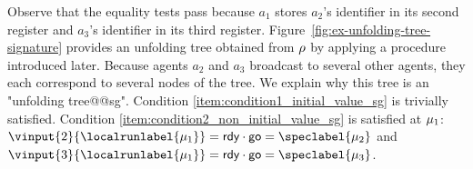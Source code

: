\begin{example}
Observe that the equality tests pass because $a_1$ stores $a_2$'s identifier in its second register and $a_3$'s identifier in its third register. Figure~\ref{fig:ex-unfolding-tree-signature} provides an unfolding tree obtained from $\rho$ by applying a procedure introduced later. Because agents $a_2$ and $a_3$ broadcast to several other agents, they each correspond to several nodes of the tree.  
	We explain why this tree is an "unfolding tree@@sg". Condition \ref{item:condition1_initial_value_sg} is trivially satisfied. Condition  \ref{item:condition2_non_initial_value_sg} is satisfied at $\mu_1$: $\vinput{2}{\localrunlabel{\node_1}}= \exready \cdot \exgotwo = \speclabel{\node_2}$ and $\vinput{3}{\localrunlabel{\node_1}}= \exready \cdot \exgotwo = \speclabel{\node_3}$.

\end{example}

